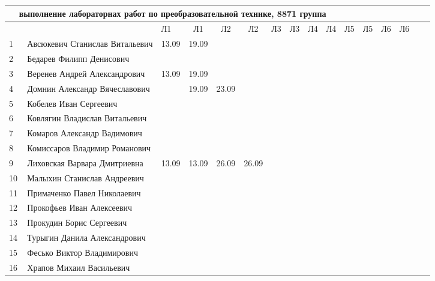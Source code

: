 \newpage
%
\begin{tabular}{l|llccccccccccccc}
\multicolumn{10}{c}{выполнение лабораторнах работ по преобразовательной технике, 8871 группа} \\
\toprule
&&Л1&Л1& Л2&Л2& Л3&Л3& Л4&Л4 &Л5&Л5& Л6&Л6\\
\midrule
1\,& Авсюкевич Станислав Витальевич   &13.09&19.09\\
2\,& Бедарев Филипп Денисович         \\
3\,& Веренев Андрей Александрович     &13.09&19.09\\
4\,& Домнин Александр Вячеславович    &&19.09&23.09\\
\midrule
5\,& Кобелев Иван Сергеевич           \\
6\,& Ковлягин Владислав Витальевич    \\
7\,& Комаров Александр Вадимович      \\
8\,& Комиссаров Владимир Романович    \\
\midrule
9\,& Лиховская Варвара Дмитриевна     &13.09&13.09&26.09&26.09\\
10\,& Малыхин Станислав Андреевич     \\
11\,& Примаченко Павел Николаевич     \\
12\,& Прокофьев Иван Алексеевич       \\
\midrule
13\,& Прокудин Борис Сергеевич        \\
14\,& Турыгин Данила Александрович    \\
15\,& Фесько Виктор Владимирович      \\
16\,& Храпов Михаил Васильевич        \\
\bottomrule
\end{tabular}



